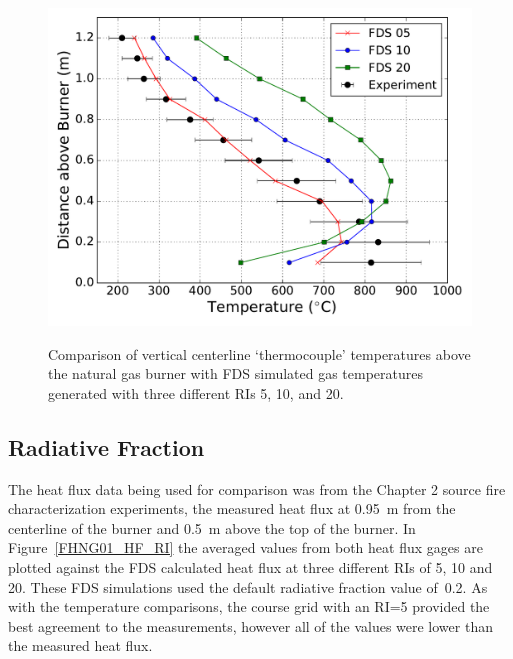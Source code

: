 \documentclass[twoside]{uocthesis}
\begin{document}
{\begin{figure}[h]
	\includegraphics[width=5in]{../Figures/FHNG01_RI_TC} \\
	\caption[Comparison of vertical centerline `thermocouple' temperatures above the natural gas burner with FDS simulated gas temperatures.]{Comparison of vertical centerline `thermocouple' temperatures above the natural gas burner with FDS simulated gas temperatures generated with three different RIs 5, 10, and 20.}
	\label{FHNG01_RI_TC}
\end{figure}

\subsection{Radiative Fraction}

The heat flux data being used for comparison was from the Chapter 2 source fire characterization experiments, the measured heat flux at 0.95~m from the centerline of the burner and 0.5~m above the top of the burner.  In Figure~\ref{FHNG01_HF_RI} the averaged values from both heat flux gages are plotted against the FDS calculated heat flux at three different RIs of 5, 10 and 20.  These FDS simulations used the default radiative fraction value of~0.2.  As with the temperature comparisons, the course grid with an RI=5 provided the best agreement to the measurements, however all of the values were lower than the measured heat flux.  

}
\end{document}
